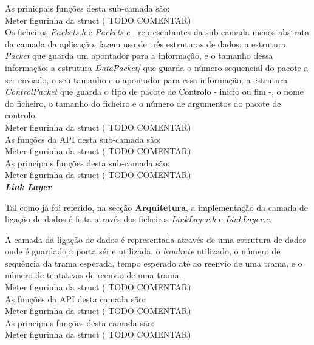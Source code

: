 \documentclass[a4paper, 11pt]{article}
\begin{document}
As prinicpais funções desta sub-camada são:\\
Meter figurinha da struct ( TODO COMENTAR)\\

Os ficheiros \textit{Packets.h} e \textit{Packets.c} , representantes da sub-camada menos abstrata da camada da aplicação, fazem uso de três estruturas de dados: a estrutura \textit{Packet} que guarda um apontador para a informação, e o tamanho dessa informação; a estrutura \textit{DataPacket]} que guarda o número sequencial do pacote a ser enviado, o seu tamanho e o apontador para essa informação; a estrutura \textit{ControlPacket} que guarda o tipo de pacote de Controlo - inicio ou fim -, o nome do ficheiro, o tamanho do ficheiro e o número de argumentos do pacote de controlo.\\
Meter figurinha da struct ( TODO COMENTAR)\\

As funções da API desta sub-camada são:\\
Meter figurinha da struct ( TODO COMENTAR)\\

As principais funções desta sub-camada são:\\
Meter figurinha da struct ( TODO COMENTAR)\\

\large\textbf{\textit{Link Layer}}\\
\normalsize

Tal como já foi referido, na secção \textbf{Arquitetura}, a implementação da camada de ligação de dados é feita através dos ficheiros \textit{LinkLayer.h} e \textit{LinkLayer.c}.

A camada da ligação de dados é representada através de uma estrutura de dados onde é guardado a porta série utilizada, o \textit{baudrate} utilizado, o número de sequência da trama esperada, tempo esperado até ao reenvio de uma trama, e o número de tentativas de reenvio de uma trama.\\
Meter figurinha da struct ( TODO COMENTAR)\\

As funções da API desta camada são:\\
Meter figurinha da struct ( TODO COMENTAR)\\

As principais funções desta camada são:\\
Meter figurinha da struct ( TODO COMENTAR)\\
\end{document}
